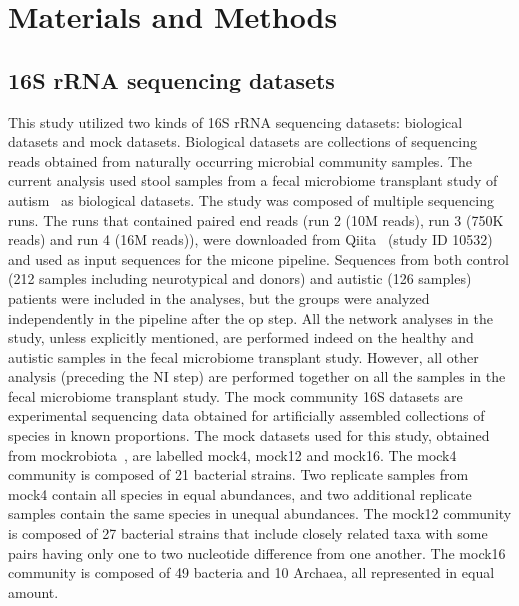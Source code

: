 
\section*{Materials and Methods}

  \subsection*{16S rRNA sequencing datasets}
  \vspace{-5mm}
  This study utilized two kinds of 16S rRNA sequencing datasets: biological datasets and mock datasets.
  Biological datasets are collections of sequencing reads obtained from naturally occurring microbial community samples.
  The current analysis used stool samples from a fecal microbiome transplant study of autism~\cite{Kang2017} as biological datasets.
  The study was composed of multiple sequencing runs.
  The runs that contained paired end reads (run 2 (10M reads), run 3 (750K reads) and run 4 (16M reads)), were downloaded from Qiita~\cite{qiita} (study ID 10532) and used as input sequences for the \ac{micone} pipeline.
  Sequences from both control (212 samples including neurotypical and donors) and autistic (126 samples) patients were included in the analyses, but the groups were analyzed independently in the pipeline after the \ac{op} step.
  All the network analyses in the study, unless explicitly mentioned, are performed indeed on the healthy and autistic samples in the fecal microbiome transplant study.
  However, all other analysis (preceding the NI step) are performed together on all the samples in the fecal microbiome transplant study.
  The mock community 16S datasets are experimental sequencing data obtained for artificially assembled collections of species in known proportions.
  The mock datasets used for this study, obtained from mockrobiota~\cite{Bokulich2016}, are labelled mock4, mock12 and mock16.
  The mock4 community is composed of 21 bacterial strains.
  Two replicate samples from mock4 contain all species in equal abundances, and two additional replicate samples contain the same species in unequal abundances.
  The mock12 community is composed of 27 bacterial strains that include closely related taxa with some pairs having only one to two nucleotide difference from one another.
  The mock16 community is composed of 49 bacteria and 10 Archaea, all represented in equal amount.

